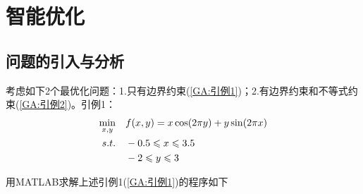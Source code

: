 % 
\chapter{智能优化}

\section{问题的引入与分析}
    考虑如下2个最优化问题：1.只有边界约束(\ref{GA:引例1})；2.有边界约束和不等式约束(\ref{GA:引例2})。引例1：
    \begin{align}
    \label{GA:引例1}
    \mathop{\min}\limits_{x,y}\quad &f(x,y)=x \cos(2\pi y)+y \sin(2\pi x)\\
    s.t.\quad &  -0.5\leqslant x\leqslant 3.5 \notag\\
    & -2\leqslant y\leqslant 3 \notag
    \end{align}
    \par
    用MATLAB求解上述引例1(\ref{GA:引例1})的程序如下
